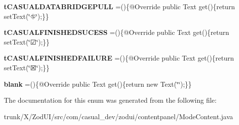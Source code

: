 \begin{DoxyCompactItemize}
\item 
\hypertarget{enumcom_1_1casual__dev_1_1zodui_1_1contentpanel_1_1_mode_content_1_1emote_ad9c645c7da5820b87ade21e6e88a4518}{{\bfseries t\-C\-A\-S\-U\-A\-L\-D\-A\-T\-A\-B\-R\-I\-D\-G\-E\-P\-U\-L\-L} =()\{@Override public Text get()\{return set\-Text(\char`\"{}⛗\char`\"{});\}\}}\label{enumcom_1_1casual__dev_1_1zodui_1_1contentpanel_1_1_mode_content_1_1emote_ad9c645c7da5820b87ade21e6e88a4518}

\item 
\hypertarget{enumcom_1_1casual__dev_1_1zodui_1_1contentpanel_1_1_mode_content_1_1emote_a8c0920ab7b4c73bf522bcfa86ef65309}{{\bfseries t\-C\-A\-S\-U\-A\-L\-F\-I\-N\-I\-S\-H\-E\-D\-S\-U\-C\-E\-S\-S} =()\{@Override public Text get()\{return set\-Text(\char`\"{}☑\char`\"{});\}\}}\label{enumcom_1_1casual__dev_1_1zodui_1_1contentpanel_1_1_mode_content_1_1emote_a8c0920ab7b4c73bf522bcfa86ef65309}

\item 
\hypertarget{enumcom_1_1casual__dev_1_1zodui_1_1contentpanel_1_1_mode_content_1_1emote_a8757274337b99a04d86750d89a228fdd}{{\bfseries t\-C\-A\-S\-U\-A\-L\-F\-I\-N\-I\-S\-H\-E\-D\-F\-A\-I\-L\-U\-R\-E} =()\{@Override public Text get()\{return set\-Text(\char`\"{}☒\char`\"{});\}\}}\label{enumcom_1_1casual__dev_1_1zodui_1_1contentpanel_1_1_mode_content_1_1emote_a8757274337b99a04d86750d89a228fdd}

\item 
\hypertarget{enumcom_1_1casual__dev_1_1zodui_1_1contentpanel_1_1_mode_content_1_1emote_a2db37e262686df77b79339f36aa9dddd}{{\bfseries blank} =()\{@Override public Text get()\{return new Text(\char`\"{}\char`\"{});\}\}}\label{enumcom_1_1casual__dev_1_1zodui_1_1contentpanel_1_1_mode_content_1_1emote_a2db37e262686df77b79339f36aa9dddd}

\end{DoxyCompactItemize}


The documentation for this enum was generated from the following file\-:\begin{DoxyCompactItemize}
\item 
trunk/\-X/\-Zod\-U\-I/src/com/casual\-\_\-dev/zodui/contentpanel/Mode\-Content.\-java\end{DoxyCompactItemize}

